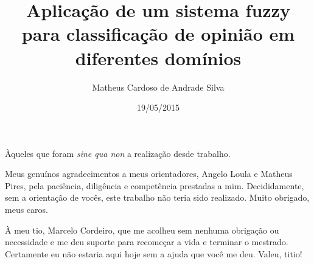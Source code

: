 \documentclass[msc, a4paper, classic, pt]{ufbathesis}
\title{Aplicação de um sistema fuzzy para classificação de opinião em diferentes domínios}
\date{19/05/2015}
\author{Matheus Cardoso de Andrade Silva}
\begin{document}
\frontpage

\frontmatter

\presentationpage

\catalogingsheet


\acknowledgements
Àqueles que foram \textit{sine qua non} a realização desde trabalho. 

Meus genuínos agradecimentos a meus orientadores, Angelo Loula e Matheus Pires, pela paciência, diligência e competência prestadas a mim. Decididamente, sem a orientação de vocês, este trabalho não teria sido realizado. Muito obrigado, meus caros.

À meu tio, Marcelo Cordeiro, que me acolheu sem nenhuma obrigação ou necessidade e me deu suporte para recomeçar a vida e terminar o mestrado. Certamente eu não estaria aqui hoje sem a ajuda que você me deu. Valeu, titio!
\end{document}

